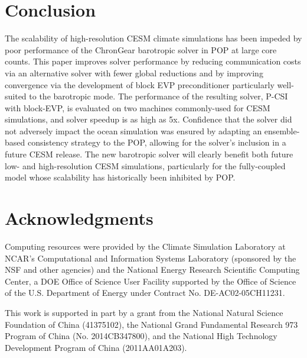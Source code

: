 \documentclass{sig-alternate-05-2015}
\begin{document}
\section{Conclusion} \label{se:conc}

The scalability of high-resolution CESM climate simulations has been
impeded by poor performance of the ChronGear barotropic solver in POP at
large core counts.  This paper improves solver performance by
reducing communication costs via an alternative solver with fewer
global reductions and by improving convergence via the development of
block EVP preconditioner particularly well-suited to the barotropic
mode.  The performance of the resulting solver, P-CSI with block-EVP,
is evaluated on two machines commonly-used for CESM simulations, and
solver speedup is as high as 5x.  Confidence that the solver did
not adversely impact the ocean simulation was ensured by adapting an
ensemble-based consistency strategy to the POP, allowing for the solver's
inclusion in a future CESM release.  The new barotropic solver
will clearly benefit both future low- and high-resolution CESM simulations,
particularly for the fully-coupled model whose scalability has historically been inhibited
by POP.







\section{Acknowledgments}
Computing resources were provided by the Climate
Simulation Laboratory at NCAR's Computational and Information Systems
Laboratory (sponsored by the NSF and other
agencies) and the National Energy Research Scientific Computing
Center, a DOE Office of Science User Facility supported by the Office
of Science of the U.S. Department of Energy under Contract
No. DE-AC02-05CH11231.

This work is supported in part by a grant from the National Natural Science Foundation
of China (41375102), the National Grand Fundamental Research 973 Program of China (No. 2014CB347800), and the National High Technology Development Program of China
(2011AA01A203).
\end{document}

